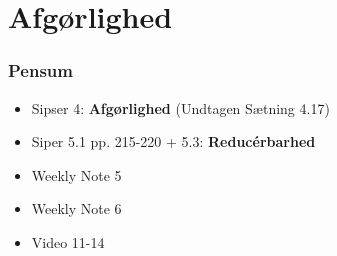 \section{Afgørlighed}%
\label{sec:Afgørlighed}

\begin{frame}
  \frametitle{Pensum}
  \begin{itemize}
    \item Sipser 4: \textbf{Afgørlighed} (Undtagen Sætning 4.17)
    \item Siper 5.1 pp. 215-220 + 5.3: \textbf{Reducérbarhed}
    \item Weekly Note 5
    \item Weekly Note 6
    \item Video 11-14
  \end{itemize}
\end{frame}



